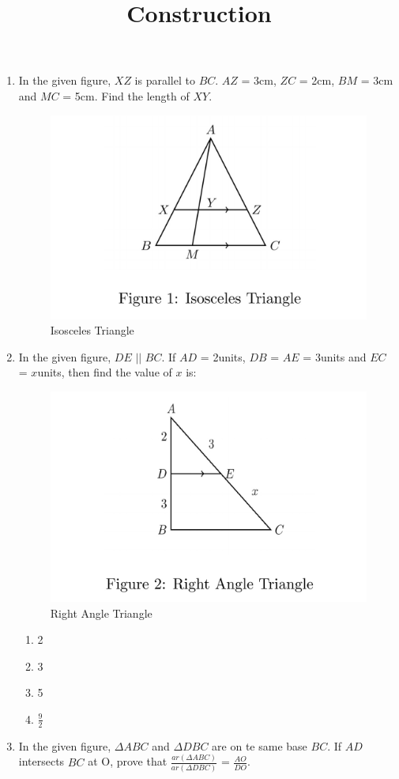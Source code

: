 \documentclass{article}
\title{\textbf{Construction}}
\date{}
\begin{document}
\maketitle

\begin{enumerate}
	\item In the given figure, $XZ$ is parallel to $BC$. $AZ$ = 3cm, $ZC$ = 2cm, $BM$ = 3cm and $MC$ = 5cm. Find the length of $XY$.
		\begin{figure}[h!]
			\centering
			\includegraphics [width=0.5\columnwidth,height=0.3\columnwidth] {figs/fig1.jpg}
			\caption{Isosceles Triangle}
			\label{fig1.jpg}
		\end{figure}

	\item In the given figure, $DE$ $||$ $BC$. If $AD$ = 2units, $DB$ = $AE$ = 3units and $EC$ = $x$units, then find the value of $x$ is:

		\begin{figure}[h!]
			\centering
			\includegraphics [width=0.5\columnwidth,height=0.3\columnwidth] {figs/fig2.jpg}
			\caption{Right Angle Triangle}
			\label{fig2.jpg}
		\end{figure}

			\begin{enumerate}
				\item 2
				\item 3
				\item 5
				\item $\frac{9}{2}$
			\end{enumerate}

		\newpage

	\item In the given figure, $\Delta ABC$ and $\Delta DBC$ are on te same base $BC$. If $AD$ intersects $BC$ at O, prove that $\frac { ar(\Delta ABC)}{ar (\Delta DBC)}$ = $\frac{AO}{DO}$.


\end{enumerate}
\end{document}
